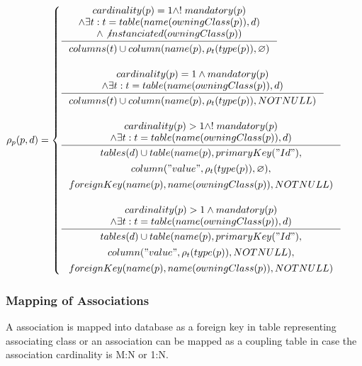 \documentclass[11pt]{article}
\begin{document}
$\rho_p(p, d) = \begin{cases}
  \inference{cardinality(p) = 1 \wedge !\;mandatory(p)
 \\ \wedge \exists t : t = table(name(owningClass(p)), d) 
 \\ \wedge \not instanciated(owningClass(p))
 }{\begin{gathered}
	  columns(t) \cup column(name(p), \rho_t(type(p)), \varnothing )
\end{gathered}
 } \\ \\

  \inference{cardinality(p) = 1 \wedge mandatory(p)
 \\ \wedge \exists t : t = table(name(owningClass(p)), d)}{\begin{gathered}
 	 columns(t) \cup column(name(p), \rho_t(type(p)), NOTNULL ) \\ 
\end{gathered}} 
\\ \\
 
 \inference{ cardinality(p) > 1 \wedge !\;mandatory(p) \\ \wedge \exists t : t = table(name(owningClass(p)), d)}{\begin{gathered}tables(d) \cup  table(name(p), primaryKey("Id"), \\ column("value", \rho_t(type(p)), \varnothing), \\ foreignKey(name(p), name(owningClass(p)), NOTNULL) \\
\end{gathered}}
\\ \\

 \inference{ cardinality(p) > 1 \wedge mandatory(p) \\ \wedge \exists t : t = table(name(owningClass(p)), d) }{\begin{gathered} tables(d) \cup  table(name(p), primaryKey("Id"), \\ column("value", \rho_t(type(p)), NOTNULL), \\ foreignKey(name(p), name(owningClass(p)), NOTNULL)
	 \end{gathered}}
 \end{cases}$

\subsubsection{Mapping of Associations}
A association is mapped into database as a foreign key in table representing associating class or an association can be mapped as a coupling table in case the association cardinality is M:N or 1:N.
\end{document}
